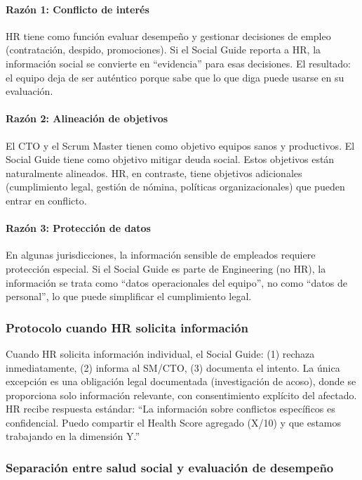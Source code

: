 \paragraph{Razón 1: Conflicto de interés}
HR tiene como función evaluar desempeño y gestionar decisiones de empleo (contratación, despido, promociones). Si el Social Guide reporta a HR, la información social se convierte en ``evidencia'' para esas decisiones. El resultado: el equipo deja de ser auténtico porque sabe que lo que diga puede usarse en su evaluación.

\paragraph{Razón 2: Alineación de objetivos}

El CTO y el Scrum Master tienen como objetivo equipos sanos y productivos. El Social Guide tiene como objetivo mitigar deuda social. Estos objetivos están naturalmente alineados. HR, en contraste, tiene objetivos adicionales (cumplimiento legal, gestión de nómina, políticas organizacionales) que pueden entrar en conflicto.

\paragraph{Razón 3: Protección de datos}

En algunas jurisdicciones, la información sensible de empleados requiere protección especial. Si el Social Guide es parte de Engineering (no HR), la información se trata como ``datos operacionales del equipo'', no como ``datos de personal'', lo que puede simplificar el cumplimiento legal.

\subsubsection{Protocolo cuando HR solicita información}

Cuando HR solicita información individual, el Social Guide: (1) rechaza inmediatamente, (2) informa al SM/CTO, (3) documenta el intento. La única excepción es una obligación legal documentada (investigación de acoso), donde se proporciona solo información relevante, con consentimiento explícito del afectado. HR recibe respuesta estándar: ``La información sobre conflictos específicos es confidencial. Puedo compartir el Health Score agregado (X/10) y que estamos trabajando en la dimensión Y.''

\subsubsection{Separación entre salud social y evaluación de desempeño}

